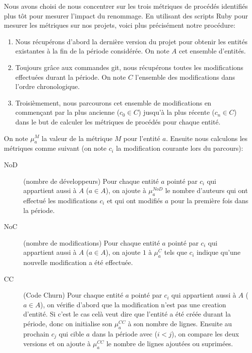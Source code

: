 Nous avons choisi de nous concentrer sur les trois métriques de procédés identifiés plus tôt pour mesurer l'impact du renommage. En utilisant des scripts Ruby pour mesurer les métriques sur nos projets, voici plus précisément notre procédure: 

\begin{enumerate}
\item  Nous récupérons d'abord la dernière version du projet pour obtenir les entités existantes à la fin de la période considérée. On note $A$ cet ensemble d'entités.
\item Toujours grâce aux commandes git, nous récupérons toutes les modifications effectuées durant la période. On note $C$ l'ensemble des modifications dans l'ordre chronologique.
\item  Troisièmement, nous parcourons cet ensemble de modifications en commençant par la plus ancienne ($c_0 \in C$) jusqu'à la plus récente ($c_n \in C$) dans le but de calculer les métriques de procédés pour chaque entité.
\end{enumerate}

 On note $\mu_{a}^{M}$ la valeur de la métrique $M$ pour l'entité $a$. Ensuite nous calculons les métriques comme suivant (on note $c_i$ la modification courante lors du parcours):

\begin{description}
	\item[NoD] (nombre de développeurs) Pour chaque entité $a$ pointé par $c_i$ qui appartient aussi à $A$ ($a \in A$), on ajoute à $\mu_{a}^{NoD}$ le nombre d'auteurs qui ont effectué les modifications $c_i$ et qui ont modifiés $a$ pour la première fois dans la période.
	\item[NoC] (nombre de modifications) Pour chaque entité $a$ pointé par $c_i$ qui appartient aussi à $A$ ($a \in A$), on ajoute $1$ à $\mu_{a}^{C}$ tels que $c_i$ indique qu'une nouvelle modification a été effectuée.
	\item[CC] (Code Churn) Pour chaque entité $a$ pointé par $c_i$ qui appartient aussi à $A$ ($a \in A$), on vérifie d'abord que la modification n'est pas une creation d'entité. Si c'est le cas celà veut dire que l'entité a été créée durant la période, donc on initialise son $\mu_{a}^{CC}$ à son nombre de lignes. Ensuite au prochain $c_j$ qui cible $a$ dans la période avec ($i < j$), on compare les deux versions et on ajoute à $\mu_{a}^{CC}$ le nombre de lignes ajoutées ou suprimées.
\end{description}





